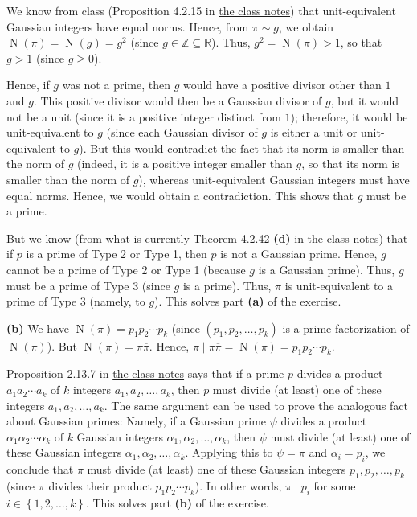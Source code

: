 \documentclass[paper=a4, fontsize=12pt]{scrartcl}%
\theoremstyle{plainsl}
\theoremstyle{definition}
\theoremstyle{remark}
\begin{document}
We know from class (Proposition 4.2.15 in
\href{http://www.cip.ifi.lmu.de/~grinberg/t/19s/notes.pdf}{the class notes})
that unit-equivalent Gaussian integers have equal norms. Hence, from $\pi\sim
g$, we obtain $\operatorname*{N}\left(  \pi\right)  =\operatorname*{N}\left(
g\right)  =g^{2}$ (since $g\in\mathbb{Z}\subseteq\mathbb{R}$). Thus,
$g^{2}=\operatorname*{N}\left(  \pi\right)  >1$, so that $g>1$ (since $g\geq0$).

Hence, if $g$ was not a prime, then $g$ would have a positive divisor other than $1$
and $g$. This positive divisor would then be a Gaussian divisor of $g$,
but it would not be a unit (since it is a
positive integer distinct from $1$);
therefore, it would be unit-equivalent to $g$
(since each Gaussian divisor of $g$ is either a unit or unit-equivalent to
$g$).
But this would contradict the fact that its norm is smaller than the norm of
$g$ (indeed, it is a positive integer smaller than $g$, so that its norm
is smaller than the norm of $g$), whereas unit-equivalent Gaussian integers
must have equal norms.
Hence, we would obtain a contradiction. This shows that $g$ must be a prime.

But we know (from what is currently Theorem 4.2.42 \textbf{(d)} in
\href{http://www.cip.ifi.lmu.de/~grinberg/t/19s/notes.pdf}{the class notes})
that if $p$ is a prime of Type 2 or Type 1, then $p$ is not a Gaussian prime.
Hence, $g$ cannot be a prime of Type 2 or Type 1 (because $g$ is a Gaussian
prime). Thus, $g$ must be a prime of Type 3 (since $g$ is a prime). Thus,
$\pi$ is unit-equivalent to a prime of Type 3 (namely, to $g$). This solves
part \textbf{(a)} of the exercise.

\bigskip

\textbf{(b)} We have $\operatorname*{N}\left(  \pi\right)  =p_{1}p_{2}\cdots
p_{k}$ (since $\left(  p_{1},p_{2},\ldots,p_{k}\right)  $ is a prime
factorization of $\operatorname*{N}\left(  \pi\right)  $). But
$\operatorname*{N}\left(  \pi\right)  =\pi\overline{\pi}$. Hence, $\pi\mid
\pi\overline{\pi}=\operatorname*{N}\left(  \pi\right)  =p_{1}p_{2}\cdots
p_{k}$.

Proposition 2.13.7 in
\href{http://www.cip.ifi.lmu.de/~grinberg/t/19s/notes.pdf}{the class notes}
says that if a prime $p$ divides a product $a_{1}a_{2}\cdots a_{k}$ of $k$
integers $a_{1},a_{2},\ldots,a_{k}$, then $p$ must divide (at least) one of
these integers $a_{1},a_{2},\ldots,a_{k}$. The same argument can be used to
prove the analogous fact about Gaussian primes: Namely, if a Gaussian prime
$\psi$ divides a product $\alpha_{1}\alpha_{2}\cdots\alpha_{k}$ of $k$
Gaussian integers $\alpha_{1},\alpha_{2},\ldots,\alpha_{k}$, then $\psi$ must
divide (at least) one of these Gaussian integers $\alpha_{1},\alpha_{2}%
,\ldots,\alpha_{k}$. Applying this to $\psi=\pi$ and $\alpha_{i}=p_{i}$, we
conclude that $\pi$ must divide (at least) one of these Gaussian integers
$p_{1},p_{2},\ldots,p_{k}$ (since $\pi$ divides their product $p_{1}%
p_{2}\cdots p_{k}$). In other words, $\pi\mid p_{i}$ for some $i\in\left\{
1,2,\ldots,k\right\}  $. This solves part \textbf{(b)} of the exercise.
\end{document}
